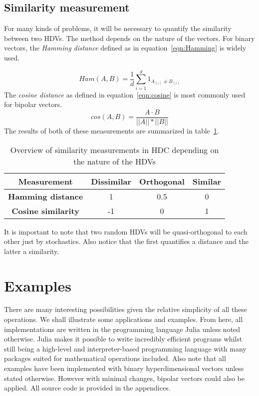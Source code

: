 \subsection*{Similarity measurement} \label{sssec:sim}
For many kinds of problems, it will be necessary to quantify the similarity between two HDVs. The method depends on the nature of the vectors. For binary vectors, the \textit{Hamming distance} defined as in equation~\ref{eqn:Hamming} is widely used.

\begin{equation}
    \label{eqn:Hamming}
    Ham(A, B) = \frac{1}{d} \sum_{i=1}^{d} 1_{A_{(i)} \neq B_{(i)}}
\end{equation}
The \textit{cosine distance} as defined in equation~\ref{eqn:cosine} is most commonly used for bipolar vectors.
\begin{equation}
    \label{eqn:cosine}
    cos(A, B) = \frac{A \cdot B}{||A|| * ||B||}
\end{equation}
The results of both of these measurements are summarized in table~\ref{tab:dist}.
\begin{table}[h]
    \caption{\label{tab:dist}Overview of similarity measurements in HDC depending on the nature of the HDVs}
    \begin{tabular}{|c||c|c|c|}
        \hline
        \textbf{Measurement} & \textbf{Dissimilar} & \textbf{Orthogonal} & \textbf{Similar} \\
        \hline
        \textbf{Hamming distance} & 1 & 0.5 & 0 \\
        \hline
        \textbf{Cosine similarity} & -1 & 0 & 1 \\
        \hline
    \end{tabular} 
\end{table}

It is important to note that two random HDVs will be quasi-orthogonal to each other just by stochastics. Also notice that the first quantifies a distance and the latter a similarity.
\section{Examples}
There are many interesting possibilities given the relative simplicity of all these operations. We shall illustrate some applications and examples. From here, all implementations are written in the programming language Julia unless noted otherwise. Julia makes it possible to write incredibly efficient programs whilst still being a high-level and interpreter-based programming language with many packages suited for mathematical operations included. Also note that all examples have been implemented with binary hyperdimensional vectors unless stated otherwise. However with minimal changes, bipolar vectors could also be applied. All source code is provided in the appendices.
